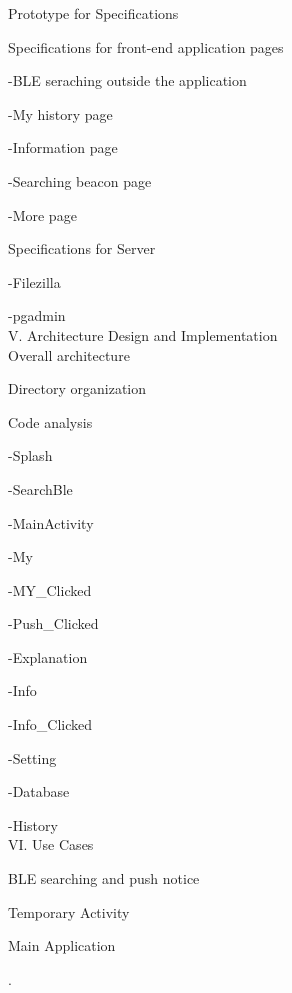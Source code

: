 \documentclass[conference]{IEEEtran}
\begin{document}
 Prototype for Specifications

 Specifications for front-end application pages

\quad\quad-BLE seraching outside the application

\quad\quad-My history page

\quad\quad-Information page

\quad\quad-Searching beacon page

\quad\quad-More page

 Specifications for Server

\quad\quad-Filezilla 

\quad\quad-pgadmin \\

V. Architecture Design and Implementation\\

 Overall architecture

 Directory organization

 Code analysis

\quad\quad-Splash

\quad\quad-SearchBle

\quad\quad-MainActivity

\quad\quad-My

\quad\quad-MY\_Clicked

\quad\quad-Push\_Clicked

\quad\quad-Explanation

\quad\quad-Info

\quad\quad-Info\_Clicked

\quad\quad-Setting

\quad\quad-Database

\quad\quad-History\\

VI. Use Cases

 BLE searching and push notice

 Temporary Activity

 Main Application

.
\\\\\\\\\\\\\\\\\\\\\\\\\\\\\\\\\\\\\\\\\\
\end{document}
